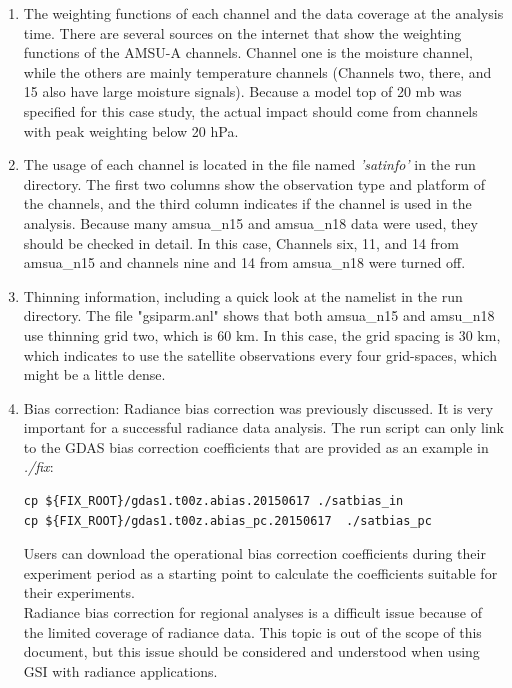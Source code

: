 \begin{enumerate}
\item The weighting functions of each channel and the data coverage at the analysis time.  There are several sources on the internet that show the weighting functions of the AMSU-A channels. Channel one is the moisture channel, while the others are mainly temperature channels (Channels two, there, and 15 also have large moisture signals).  Because a model top of 20 mb was specified for this case study, the actual impact should come from channels with peak weighting below 20 hPa.

\item The usage of each channel is located in the file named \textit{'satinfo'} in the run directory.  The first two columns show the observation type and platform of the channels, and the third column indicates if the channel is used in the analysis.  Because many amsua\_n15 and amsua\_n18 data were used, they should be checked in detail.  In this case, Channels six, 11, and 14 from amsua\_n15 and channels nine and 14 from amsua\_n18 were turned off. 

\item Thinning information, including a quick look at the namelist in the run directory. The file "gsiparm.anl" shows that both amsua\_n15 and amsu\_n18 use thinning grid two, which is 60 km.  In this case, the grid spacing is 30 km, which indicates to use the satellite observations every four grid-spaces, which might be a little dense. 

\item Bias correction: Radiance bias correction was previously discussed. It is very important for a successful radiance data analysis. The run script can only link to the GDAS bias correction coefficients that are provided as an example in \textit{./fix}:

\begin{scriptsize}
\begin{verbatim}
cp ${FIX_ROOT}/gdas1.t00z.abias.20150617 ./satbias_in
cp ${FIX_ROOT}/gdas1.t00z.abias_pc.20150617  ./satbias_pc
\end{verbatim}
\end{scriptsize}

Users can download the operational bias correction coefficients during their experiment period as a starting point to calculate the coefficients suitable for their experiments. \\

Radiance bias correction for regional analyses is a difficult issue because of the limited coverage of radiance data.  This topic is out of the scope of this document, but this issue should be considered and understood when using GSI with radiance applications. 
\end{enumerate}

